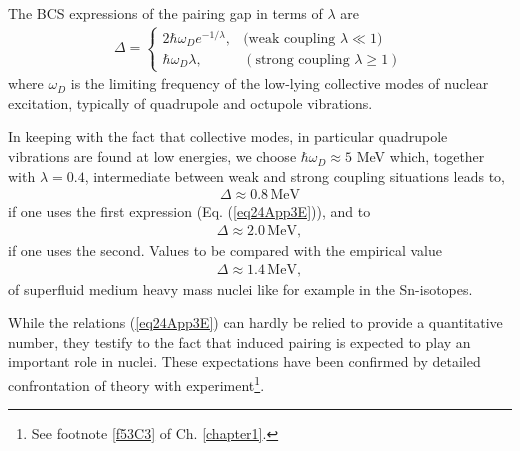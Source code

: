 The BCS expressions of the pairing gap in terms of $\lambda$ are
\begin{align}\label{eq24App3E}
\Delta=\left\{\begin{array}{ll}
2\hbar\omega_De^{-1/\lambda},&\text{(weak coupling } \lambda\ll1)\\ 
\hbar\omega_D\lambda,&(\text{strong coupling }\lambda\geq1)
\end{array}
\right. 
\end{align}
where $\omega_D$ is the limiting frequency of the low-lying collective modes of nuclear excitation, typically of quadrupole and octupole vibrations. 


In keeping with the fact that collective modes, in particular quadrupole vibrations are found at low energies, we choose $\hbar\omega_D\approx5$ MeV which, together with  $\lambda=0.4$, intermediate between weak and strong coupling situations leads to,
\begin{align}
\Delta\approx 0.8\,\text{MeV}
\end{align}
if one uses the first expression (Eq. (\ref{eq24App3E})), and to
\begin{align}
\Delta\approx2.0\,\text{MeV},
\end{align}
if one uses the second. Values to be compared with the empirical value
\begin{align}
\Delta\approx1.4\,\text{MeV},
\end{align}
of superfluid medium heavy mass nuclei like for example in the Sn-isotopes.

While the relations (\ref{eq24App3E}) can hardly be relied to provide a quantitative number, they testify to the fact that induced pairing is expected to play an important role in nuclei. These expectations have been confirmed by detailed confrontation of theory with experiment\footnote{See footnote \ref{f53C3} of Ch. \ref{chapter1}.}.
